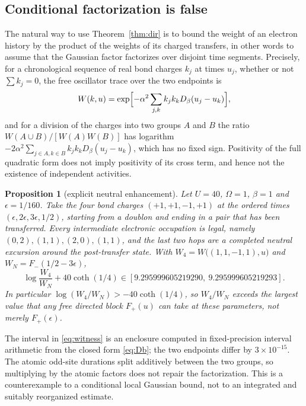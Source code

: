 \documentclass[11pt]{article}
\newtheorem{proposition}[theorem]{Proposition}
\theoremstyle{definition}
\theoremstyle{remark}
\begin{document}
\subsection{Conditional factorization is false}

The natural way to use Theorem~\ref{thm:dir} is to bound the weight of an
electron history by the product of the weights of its charged transfers, in other
words to assume that the Gaussian factor factorizes over disjoint time segments.
Precisely, for a chronological sequence of real bond charges $k_{j}$ at times
$u_{j}$, whether or not $\sum k_{j}=0$, the free oscillator trace over the two
endpoints is
\begin{equation}
W(k,u)=\exp\Bigl[-\alpha^{2}\sum_{j,k}k_{j}k_{k}D_{\beta}(u_{j}-u_{k})\Bigr],
\label{eq:W}
\end{equation}
and for a division of the charges into two groups $A$ and $B$ the ratio
$W(A\cup B)/[W(A)W(B)]$ has logarithm
$-2\alpha^{2}\sum_{j\in A,k\in B}k_{j}k_{k}D_{\beta}(u_{j}-u_{k})$, which has no
fixed sign. Positivity of the full quadratic form does not imply positivity of its
cross term, and hence not the existence of independent activities.

\begin{proposition}[explicit neutral enhancement]
\label{prop:witness}
Let $U=40$, $\Omega=1$, $\beta=1$ and $\epsilon=1/160$. Take the four bond charges
$(+1,+1,-1,+1)$ at the ordered times $(\epsilon,2\epsilon,3\epsilon,1/2)$,
starting from a doublon and ending in a pair that has been transferred. Every
intermediate electronic occupation is legal, namely $(0,2),(1,1),(2,0),(1,1)$,
and the last two hops are a completed neutral excursion around the post-transfer
state. With $W_{4}=W\bigl((1,1,-1,1),u\bigr)$ and $W_{N}=F_{-}(1/2-3\epsilon)$,
\begin{equation}
\log\frac{W_{4}}{W_{N}}+40\coth(1/4)\in[9.295999605219290,\ 9.295999605219293].
\label{eq:witness}
\end{equation}
In particular $\log(W_{4}/W_{N})>-40\coth(1/4)$, so $W_{4}/W_{N}$ exceeds the
largest value that any free directed block $F_{+}(u)$ can take at these
parameters, not merely $F_{+}(\epsilon)$.
\end{proposition}

The interval in \eqref{eq:witness} is an enclosure computed in fixed-precision
interval arithmetic from the closed form \eqref{eq:Db}; the two endpoints differ
by $3\times10^{-15}$. The atomic odd-site durations split additively between the
two groups, so multiplying by the atomic factors does not repair the
factorization. This is a counterexample to a conditional local Gaussian bound,
not to an integrated and suitably reorganized estimate.
\end{document}
